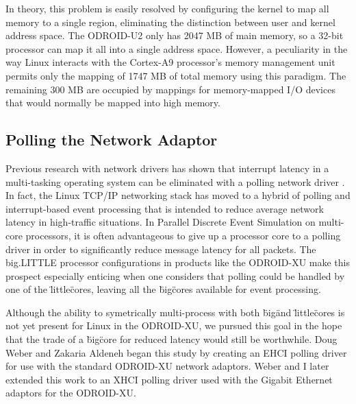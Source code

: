 \documentclass[a4paper]{article}
\begin{document}
In theory, this problem is easily resolved by configuring the kernel to map all
memory to a single region, eliminating the distinction between user and kernel
address space. The ODROID-U2 only has 2047 MB of main memory, so a 32-bit
processor can map it all into a single address space. However, a peculiarity in
the way Linux interacts with the Cortex-A9 processor's memory management unit
permits only the mapping of 1747 MB of total memory using this paradigm. The
remaining 300 MB are occupied by mappings for memory-mapped I/O devices that
would normally be mapped into high memory.


\subsection{\textbf{Polling the Network Adaptor}}

Previous research with network drivers has shown that interrupt latency in a
multi-tasking operating system can be eliminated with a polling network driver
\cite{}. In fact, the Linux TCP/IP networking stack has moved to a hybrid of
polling and interrupt-based event processing that is intended to reduce average
network latency in high-traffic situations. In Parallel Discrete Event
Simulation on multi-core processors, it is often advantageous to give up a
processor core to a polling driver in order to significantly reduce message
latency for all packets. The big.LITTLE processor configurations in products
like the ODROID-XU make this prospect especially enticing when one considers
that polling could be handled by one of the \"little\" cores, leaving all the
\"big\" cores available for event processing.

Although the ability to symetrically multi-process with both \"big\" and
\"little\" cores is not yet present for Linux in the ODROID-XU, we pursued this
goal in the hope that the trade of a \"big\" core for reduced latency would
still be worthwhile. Doug Weber and Zakaria Aldeneh began this study by creating
an EHCI polling driver for use with the standard ODROID-XU network
adaptors. Weber and I later extended this work to an XHCI polling driver used
with the Gigabit Ethernet adaptors for the ODROID-XU.
\end{document}
